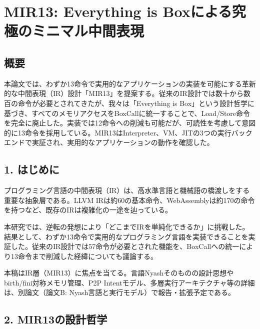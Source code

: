 \documentclass[
]{article}
\author{}
\date{}
\begin{document}
\hypertarget{mir13-everything-is-boxux306bux3088ux308bux7a76ux6975ux306eux30dfux30cbux30deux30ebux4e2dux9593ux8868ux73fe}{%
\section{MIR13: Everything is
Boxによる究極のミニマル中間表現}\label{mir13-everything-is-boxux306bux3088ux308bux7a76ux6975ux306eux30dfux30cbux30deux30ebux4e2dux9593ux8868ux73fe}}

\hypertarget{ux6982ux8981}{%
\subsection{概要}\label{ux6982ux8981}}

本論文では、わずか13命令で実用的なアプリケーションの実装を可能にする革新的な中間表現（IR）設計「MIR13」を提案する。従来のIR設計では数十から数百の命令が必要とされてきたが、我々は「Everything
is
Box」という設計哲学に基づき、すべてのメモリアクセスをBoxCallに統一することで、Load/Store命令を完全に廃止した。実装では12命令への削減も可能だが、可読性を考慮して意図的に13命令を採用している。MIR13はInterpreter、VM、JITの3つの実行バックエンドで実証され、実用的なアプリケーションの動作を確認した。

\hypertarget{ux306fux3058ux3081ux306b}{%
\subsection{1. はじめに}\label{ux306fux3058ux3081ux306b}}

プログラミング言語の中間表現（IR）は、高水準言語と機械語の橋渡しをする重要な抽象層である。LLVM
IRは約60の基本命令、WebAssemblyは約170の命令を持つなど、既存のIRは複雑化の一途を辿っている。

本研究では、逆転の発想により「どこまでIRを単純化できるか」に挑戦した。結果として、わずか13命令で実用的なプログラミング言語を実装できることを実証した。従来のIR設計では57命令が必要とされた機能を、BoxCallへの統一により13命令まで削減した経緯についても議論する。

本稿はIR層（MIR13）に焦点を当てる。言語Nyashそのものの設計思想やbirth/fini対称メモリ管理、P2P
Intentモデル、多層実行アーキテクチャ等の詳細は、別論文（論文B:
Nyash言語と実行モデル）で報告・拡張予定である。

\hypertarget{mir13ux306eux8a2dux8a08ux54f2ux5b66}{%
\subsection{2.
MIR13の設計哲学}\label{mir13ux306eux8a2dux8a08ux54f2ux5b66}}
\end{document}
